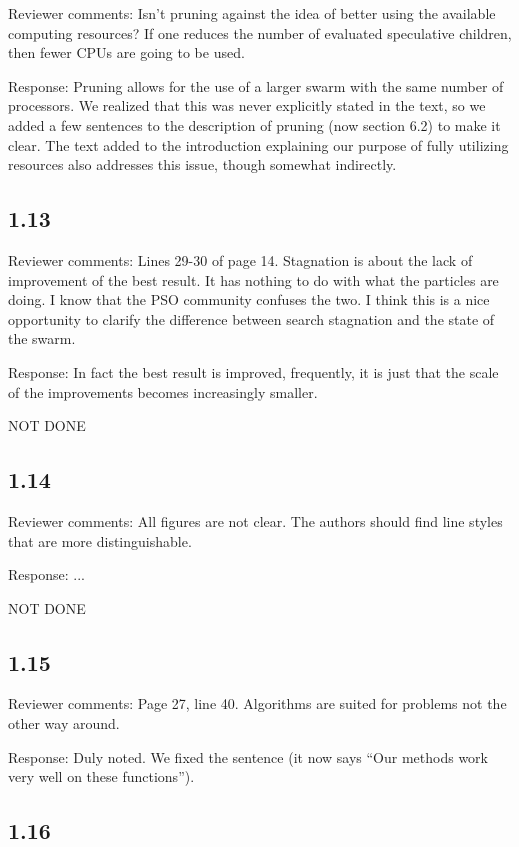 \documentclass[onecolumn, 12pt]{article}
\begin{document}
Reviewer comments: Isn't pruning against the idea of better using the available
computing resources? If one reduces the number of evaluated speculative
children, then fewer CPUs are going to be used.

Response: Pruning allows for the use of a larger swarm with the same number of
processors.  We realized that this was never explicitly stated in the text, so
we added a few sentences to the description of pruning (now section 6.2) to
make it clear.  The text added to the introduction explaining our purpose of
fully utilizing resources also addresses this issue, though somewhat
indirectly.

\subsection*{1.13}

Reviewer comments: Lines 29-30 of page 14. Stagnation is about the lack of
improvement of the best result. It has nothing to do with what the particles
are doing. I know that the PSO community confuses the two. I think this is a
nice opportunity to clarify the difference between search stagnation and the
state of the swarm.

Response: In fact the best result is improved, frequently, it is just that the
scale of the improvements becomes increasingly smaller.

NOT DONE

\subsection*{1.14}

Reviewer comments: All figures are not clear. The authors should find line
styles that are more distinguishable.

Response: ...

NOT DONE

\subsection*{1.15}

Reviewer comments: Page 27, line 40. Algorithms are suited for problems not the
other way around.

Response: Duly noted.  We fixed the sentence (it now says ``Our methods work
very well on these functions'').

\subsection*{1.16}
\end{document}
